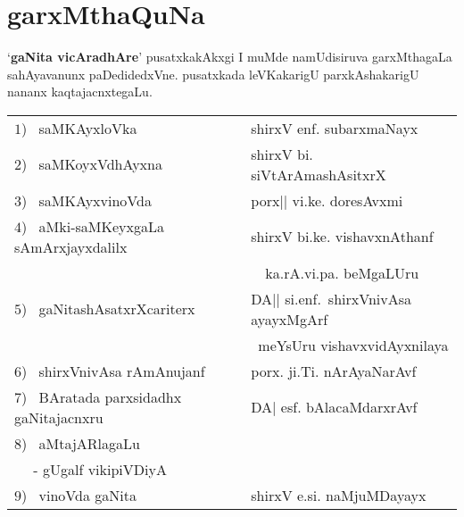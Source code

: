 \chapter{garxMthaQuNa}

`{\bf gaNita vicAradhAre}' pusatxkakAkxgi I muMde namUdisiruva garxMthagaLa sahAyavanunx paDedidedxVne. pusatxkada leVKakarigU parxkAshakarigU nananx kaqtajacnxtegaLu.

\bigskip
\noindent
\begin{tabular}{ll}
$1$)~ saMKAyxloVka & shirxV enf. subarxmaNayx\\[0.2cm]
$2$)~ saMKoyxVdhAyxna & shirxV bi. siVtArAmashAsitxrX\\[0.2cm]
$3$)~ saMKAyxvinoVda & porx|| vi.ke. doresAvxmi\\[0.2cm]
  $4$)~ aMki-saMKeyxgaLa sAmArxjayxdalilx & shirxV bi.ke. vishavxnAthanf\\
  & ~~ka.rA.vi.pa. beMgaLUru\\[0.2cm]
  $5$)~ gaNitashAsatxrXcariterx & DA|| si.enf.~shirxVnivAsa ayayxMgArf \\
  & ~meYsUru vishavxvidAyxnilaya\\[0.2cm]
$6$)~ shirxVnivAsa rAmAnujanf &  porx. ji.Ti. nArAyaNarAvf\\[0.2cm]
$7$)~ BAratada parxsidadhx gaNitajacnxru & DA| esf. bAlacaMdarxrAvf\\[0.2cm]
  $8$)~ aMtajARlagaLu &\\
~~   - gUgalf vikipiVDiyA & \\[0.2cm]
$9$)~ vinoVda gaNita & shirxV e.si. naMjuMDayayx
\end{tabular}
  
